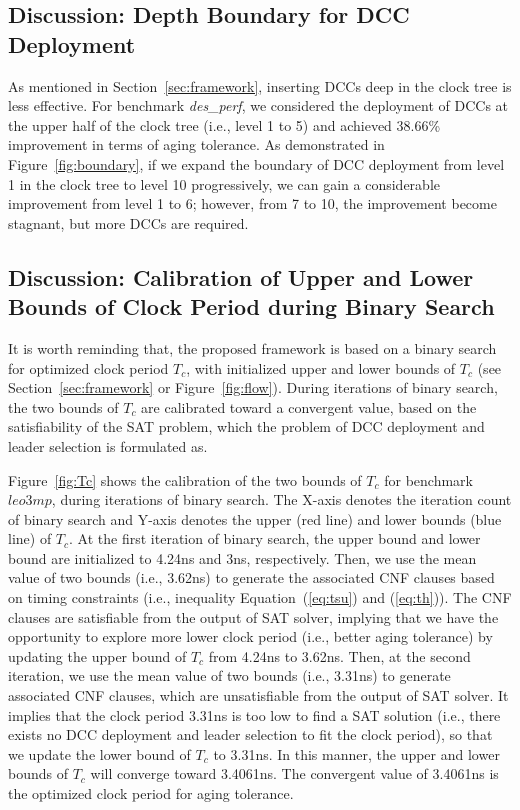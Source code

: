 \subsection{Discussion: Depth Boundary for DCC Deployment}

As mentioned in Section~\ref{sec:framework}, inserting DCCs deep in the clock tree is less effective. For benchmark \textit{des\_perf}, we considered the deployment of DCCs at the upper half of the clock tree (i.e., level 1 to 5) and achieved 38.66\% improvement in terms of aging tolerance. As demonstrated in Figure~\ref{fig:boundary}, if we expand the boundary of DCC deployment from level 1 in the clock tree to level 10 progressively, we can gain a considerable improvement from level 1 to 6; however, from 7 to 10, the improvement become stagnant, but more DCCs are required.

\subsection{Discussion: Calibration of Upper and Lower Bounds of Clock Period during Binary Search}

It is worth reminding that, the proposed framework is based on a binary search for optimized clock period $T_{c}$, with initialized upper and lower bounds of $T_{c}$ (see Section~\ref{sec:framework} or Figure~\ref{fig:flow}). During iterations of binary search, the two bounds of $T_{c}$ are calibrated toward a convergent value, based on the satisfiability of the SAT problem, which the problem of DCC deployment and leader selection is formulated as.

Figure~\ref{fig:Tc} shows the calibration of the two bounds of $T_{c}$ for benchmark $leo3mp$, during iterations of binary search. The X-axis denotes the iteration count of binary search and Y-axis denotes the upper (red line) and lower bounds (blue line) of $T_{c}$. At the first iteration of binary search, the upper bound and lower bound are initialized to 4.24ns and 3ns, respectively. Then, we use the mean value of two bounds (i.e., 3.62ns) to generate the associated CNF clauses based on timing constraints (i.e., inequality Equation~(\ref{eq:tsu}) and (\ref{eq:th})). The CNF clauses are satisfiable from the output of SAT solver, implying that we have the opportunity to explore more lower clock period (i.e., better aging tolerance) by updating the upper bound of $T_{c}$ from 4.24ns to 3.62ns. Then, at the second iteration, we use the mean value of two bounds (i.e., 3.31ns) to generate associated CNF clauses, which are unsatisfiable from the output of SAT solver. It implies that the clock period 3.31ns is too low to find a SAT solution (i.e., there exists no DCC deployment and leader selection to fit the clock period), so that we update the lower bound of $T_{c}$ to 3.31ns. In this manner, the upper and lower bounds of $T_{c}$ will converge toward 3.4061ns. The convergent value of 3.4061ns is the optimized clock period for aging tolerance.

